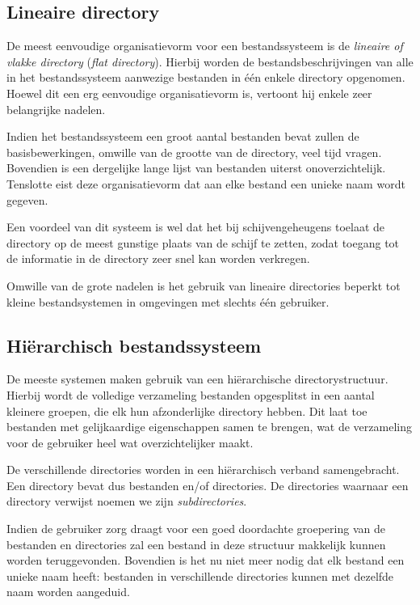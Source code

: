 \subsection{Lineaire directory}

De meest eenvoudige organisatievorm voor een bestandssysteem is
de \emph{lineaire of vlakke directory}
(\emph{flat directory}). Hierbij worden de
bestandsbeschrijvingen van alle in het bestandssysteem aanwezige
bestanden in \'e\'en enkele directory opgenomen. Hoewel dit een erg
eenvoudige organisatievorm is, vertoont hij enkele zeer belangrijke
nadelen.

Indien het bestandssysteem een groot aantal bestanden bevat
zullen de basisbewerkingen, omwille van de grootte van de directory,
veel tijd vragen. Bovendien is een dergelijke lange lijst van
bestanden uiterst onoverzichtelijk. Tenslotte eist deze
organisatievorm dat aan elke bestand een unieke naam wordt
gegeven.

Een voordeel van dit systeem is wel dat het bij
schijvengeheugens toelaat de directory op de meest gunstige plaats van
de schijf te zetten, zodat toegang tot de informatie in de directory
zeer snel kan worden verkregen.

Omwille van de grote nadelen is het gebruik van lineaire
directories beperkt tot kleine bestandsystemen in omgevingen met
slechts \'e\'en gebruiker.

\subsection{Hi\"erarchisch bestandssysteem}

De meeste systemen maken gebruik van een hi\"erarchische
directorystructuur. Hierbij wordt de volledige verzameling bestanden
opgesplitst in een aantal kleinere groepen, die elk hun afzonderlijke
directory hebben. Dit laat toe bestanden met gelijkaardige
eigenschappen samen te brengen, wat de verzameling voor de gebruiker
heel wat overzichtelijker maakt.

De verschillende directories worden in een hi\"erarchisch verband
samengebracht. Een directory bevat dus bestanden en/of directories. De
directories waarnaar een directory verwijst noemen we zijn
\emph{subdirectories}.

Indien de gebruiker zorg draagt voor een goed doordachte
groepering van de bestanden en directories zal een bestand in deze
structuur makkelijk kunnen worden teruggevonden. Bovendien is het nu
niet meer nodig dat elk bestand een unieke naam heeft: bestanden in
verschillende directories kunnen met dezelfde naam worden
aangeduid.

